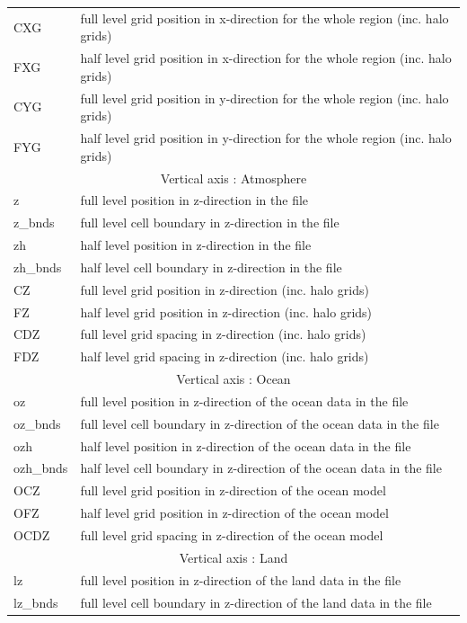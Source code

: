 \begin{longtable}{l|l}
CXG & full level grid position in x-direction for the whole region (inc. halo grids) \\
FXG & half level grid position in x-direction for the whole region (inc. halo grids) \\
CYG & full level grid position in y-direction for the whole region (inc. halo grids) \\
FYG & half level grid position in y-direction for the whole region (inc. halo grids) \\ \hline
\multicolumn{2}{c}{Vertical axis : Atmosphere}\\ \hline
z         & full level position in z-direction in the file \\
z\_bnds   & full level cell boundary in z-direction in the file \\
zh        & half level position in z-direction in the file \\
zh\_bnds  & half level cell boundary in z-direction in the file \\
CZ  & full level grid position in z-direction (inc. halo grids) \\
FZ  & half level grid position in z-direction (inc. halo grids) \\
CDZ & full level grid spacing  in z-direction (inc. halo grids) \\
FDZ & half level grid spacing  in z-direction (inc. halo grids) \\ \hline
\multicolumn{2}{c}{Vertical axis : Ocean}\\ \hline
oz        & full level position in z-direction of the ocean data in the file \\
oz\_bnds  & full level cell boundary in z-direction of the ocean data in the file \\
ozh       & half level position in z-direction of the ocean data in the file \\
ozh\_bnds & half level cell boundary in z-direction of the ocean data in the file \\
OCZ  & full level grid position in z-direction of the ocean model \\
OFZ  & half level grid position in z-direction of the ocean model \\
OCDZ & full level grid spacing in z-direction of the ocean model \\  \hline
\multicolumn{2}{c}{Vertical axis : Land}\\ \hline
lz        & full level position in z-direction of the land data in the file \\
lz\_bnds  & full level cell boundary in z-direction of the land data in the file \\

\end{longtable}
